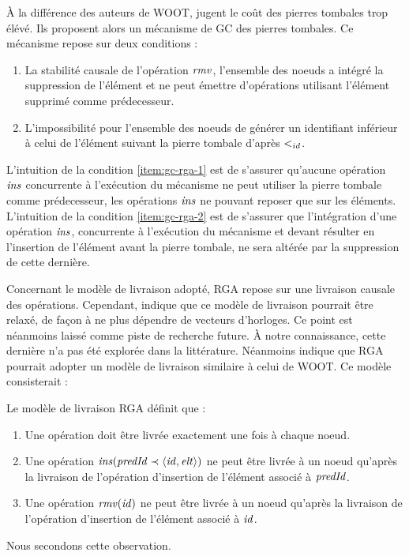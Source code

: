 À la différence des auteurs de WOOT, \textcite{ROH2011354} jugent le coût des pierres tombales trop élévé.
Ils proposent alors un mécanisme de \ac{GC} des pierres tombales.
Ce mécanisme repose sur deux conditions :
\label{sec:gc-rga}
\begin{enumerate}
  \item \label{item:gc-rga-1}
    La stabilité causale de l'opération $\mathit{rmv}$, \ie l'ensemble des noeuds a intégré la suppression de l'élément et ne peut émettre d'opérations utilisant l'élément supprimé comme prédecesseur.
  \item \label{item:gc-rga-2}
    L'impossibilité pour l'ensemble des noeuds de générer un identifiant inférieur à celui de l'élément suivant la pierre tombale d'après $<_{id}$.
\end{enumerate}
L'intuition de la condition \ref{item:gc-rga-1} est de s'assurer qu'aucune opération $\mathit{ins}$ concurrente à l'exécution du mécanisme ne peut utiliser la pierre tombale comme prédecesseur, les opérations $\mathit{ins}$ ne pouvant reposer que sur les éléments.
L'intuition de la condition \ref{item:gc-rga-2} est de s'assurer que l'intégration d'une opération $\mathit{ins}$, concurrente à l'exécution du mécanisme et devant résulter en l'insertion de l'élément avant la pierre tombale, ne sera altérée par la suppression de cette dernière.

Concernant le modèle de livraison adopté, \ac{RGA} repose sur une livraison causale des opérations.
Cependant, \cite{ROH2011354} indique que ce modèle de livraison pourrait être relaxé, de façon à ne plus dépendre de vecteurs d'horloges.
Ce point est néanmoins laissé comme piste de recherche future.
À notre connaissance, cette dernière n'a pas été explorée dans la littérature.
Néanmoins \textcite{2021-these-vic} indique que \ac{RGA} pourrait adopter un modèle de livraison similaire à celui de WOOT.
Ce modèle consisterait :
\begin{definition}
  Le modèle de livraison \ac{RGA} définit que :
  \begin{enumerate}
    \item Une opération doit être livrée exactement une fois à chaque noeud.
    \item Une opération $\mathit{ins}(\mathit{predId} \prec \langle \mathit{id},\mathit{elt} \rangle)$ ne peut être livrée à un noeud qu'après la livraison de l'opération d'insertion de l'élément associé à $\mathit{predId}$.
    \item Une opération $\mathit{rmv}(\mathit{id})$ ne peut être livrée à un noeud qu'après la livraison de l'opération d'insertion de l'élément associé à $\mathit{id}$.
  \end{enumerate}
\end{definition}
Nous secondons cette observation.

